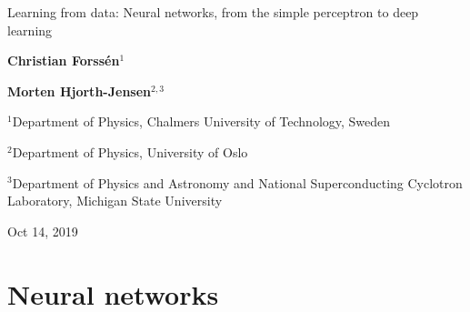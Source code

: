\documentclass[%
oneside,                 %
final,                   %
10pt]{article}
\begin{document}

\newcommand{\exercisesection}[1]{\subsection*{#1}}







\thispagestyle{empty}

\begin{center}
{\LARGE\bf
\begin{spacing}{1.25}
Learning from data: Neural networks, from the simple perceptron to deep learning
\end{spacing}
}
\end{center}


\begin{center}
{\bf Christian Forssén${}^{1}$} \\ [0mm]
\end{center}


\begin{center}
{\bf Morten Hjorth-Jensen${}^{2, 3}$} \\ [0mm]
\end{center}

\begin{center}
\centerline{{\small ${}^1$Department of Physics, Chalmers University of Technology, Sweden}}
\centerline{{\small ${}^2$Department of Physics, University of Oslo}}
\centerline{{\small ${}^3$Department of Physics and Astronomy and National Superconducting Cyclotron Laboratory, Michigan State University}}
\end{center}
    

\begin{center}
Oct 14, 2019
\end{center}

\vspace{1cm}


\section{Neural networks}
\end{document}
